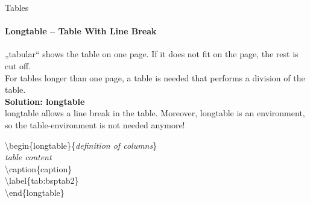 \begin{frame}{Tables}
\framesubtitle{Longtable -- Table With Line Break}
\bigskip
„tabular“ shows the table on one page. If it does not fit on the page, the rest is cut off.\\
For tables longer than one page, a table is needed that performs a division of the table.\\
\textbf{Solution: {\ttfamily longtable}}\\
{\ttfamily longtable} allows a line break in the table. Moreover, {\ttfamily longtable} is an environment, so the  {\ttfamily table}-environment is not needed anymore!\\[3mm]

\begin{ttfamily}
\color{unibablueI}\textbackslash begin\color{black}\{longtable\}\{\textit{definition of columns}\}\\
\textit{table content}\\
\color{nounibaredI}\textbackslash caption\color{black}\{caption\}\\
\color{nounibaredI}\textbackslash label\color{black}\{tab:bsptab2\}\\
\color{unibablueI}\textbackslash end\color{black}\{longtable\}
\end{ttfamily}
\end{frame}


